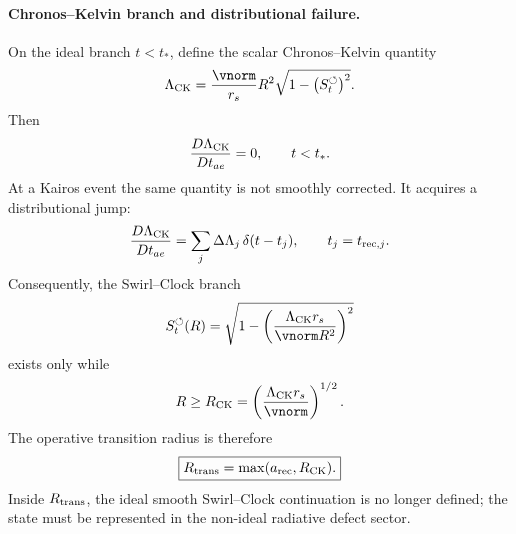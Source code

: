 \paragraph{Chronos--Kelvin branch and distributional failure.}
On the ideal branch $t<t_\ast$, define the scalar Chronos--Kelvin quantity
\begin{equation}
    \Lambda_{\rm CK}
    =
    \frac{\vnorm}{r_s}R^2
    \sqrt{1-\left(S_t^{\boldsymbol{\circlearrowleft}}\right)^2}.
    \label{eq:sst_lambda_ck_hitting}
\end{equation}
Then
\begin{equation}
    \frac{D\Lambda_{\rm CK}}{Dt_{ae}}=0,
    \qquad t<t_\ast.
    \label{eq:sst_lambda_ck_conserved_before_hit}
\end{equation}
At a Kairos event the same quantity is not smoothly corrected. It acquires a distributional jump:
\begin{equation}
    \frac{D\Lambda_{\rm CK}}{Dt_{ae}}
    =
    \sum_j \Delta\Lambda_j\,\delta(t-t_j),
    \qquad t_j=t_{{\rm rec},j}.
    \label{eq:sst_lambda_ck_distributional_jump}
\end{equation}
Consequently, the Swirl--Clock branch
\begin{equation}
    S_t^{\boldsymbol{\circlearrowleft}}(R)
    =
    \sqrt{1-
    \left(
        \frac{\Lambda_{\rm CK}r_s}{\vnorm R^2}
    \right)^2}
    \label{eq:sst_swirl_clock_branch_hitting}
\end{equation}
exists only while
\begin{equation}
    R\ge R_{\rm CK}
    =
    \left(\frac{\Lambda_{\rm CK}r_s}{\vnorm}\right)^{1/2}.
    \label{eq:sst_ck_radius_bound}
\end{equation}
The operative transition radius is therefore
\begin{equation}
    \boxed{
    R_{\rm trans}=\max(a_{\rm rec},R_{\rm CK}).
    }
    \label{eq:sst_transition_radius_max}
\end{equation}
Inside $R_{\rm trans}$, the ideal smooth Swirl--Clock continuation is no longer defined; the state must be represented in the non-ideal radiative defect sector.


